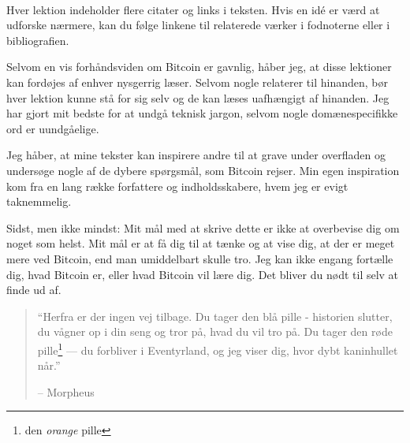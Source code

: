 \documentclass[paper=6in:9in,pagesize=pdftex,
               headinclude=on,footinclude=on,12pt]{scrbook}
\begin{document}
~

Hver lektion indeholder flere citater og links i teksten. Hvis en id\'e er værd at udforske nærmere, kan du følge linkene til relaterede værker i fodnoterne eller i bibliografien.

Selvom en vis forhåndsviden om Bitcoin er gavnlig, håber jeg, at disse lektioner kan fordøjes af enhver nysgerrig læser. Selvom nogle relaterer til hinanden, bør hver lektion kunne stå for sig selv og de kan læses uafhængigt af hinanden. Jeg har gjort mit bedste for at undgå teknisk jargon, selvom nogle domænespecifikke ord er uundgåelige.

Jeg håber, at mine tekster kan inspirere andre til at grave under overfladen og undersøge nogle af de dybere spørgsmål, som Bitcoin rejser. Min egen inspiration kom fra en lang række forfattere og indholdsskabere, hvem jeg er evigt taknemmelig.

Sidst, men ikke mindst: Mit mål med at skrive dette er ikke at overbevise dig om noget som helst. Mit mål er at få dig til at tænke og at vise dig, at der er meget mere ved Bitcoin, end man umiddelbart skulle tro. Jeg kan ikke engang fortælle dig, hvad Bitcoin er, eller hvad Bitcoin vil lære dig. Det bliver du nødt til selv at finde ud af.\begin{quotation}\begin{samepage}
\enquote{Herfra er der ingen vej tilbage. Du tager den blå pille - historien slutter, du vågner op i din seng og tror på, hvad du vil tro på. Du tager den røde pille\footnote{den \textit{orange} pille} --- du forbliver i Eventyrland, og jeg viser dig, hvor dybt kaninhullet når.}
\begin{flushright} -- Morpheus \end{flushright}\end{samepage}\end{quotation}
\end{document}
